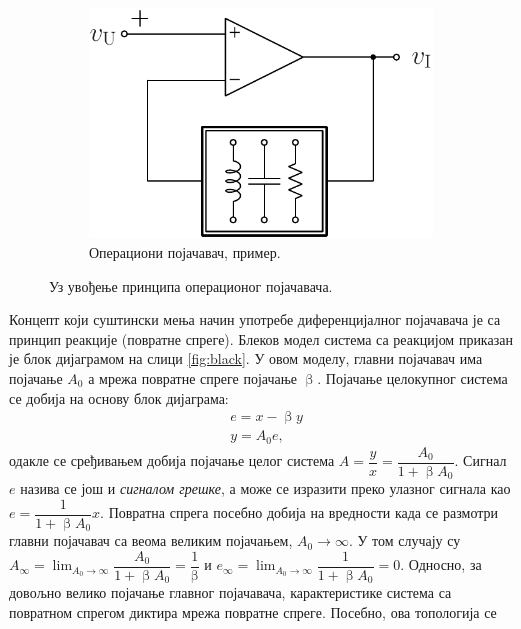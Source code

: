 \begin{figure}[b!]
    ~ %
    \begin{subfigure}[c]{0.32\textwidth}
    \centering
        \includegraphics[scale=0.5]
        {fig/black-model-op-conc.pdf}
        \caption{Операциони појачавач, пример.}
        \label{fig:black3}
    \end{subfigure}
    \caption{Уз увођење принципа операционог појачавача.}
\end{figure}
%
Концепт који суштински мења начин употребе диференцијалног појачавача 
је са принцип реакције (повратне спреге). Блеков модел система са реакцијом 
приказан је 
блок дијаграмом
на слици \ref{fig:black}. У овом моделу, главни 
појачавач има појачање $A_0$ а мрежа повратне спреге појачање 
$\upbeta$. Појачање целокупног система се добија на основу 
блок дијаграма:
\begin{eqnarray}
	&e = x - \upbeta y \\
	&y = A_0 e, 
\end{eqnarray}
одакле се сређивањем добија појачање целог система
$A = \dfrac{y}{x} = \dfrac{A_0}{1 + \upbeta A_0}$.   
%
Сигнал $e$ назива се још и \textit{сигналом грешке}, а може се 
изразити преко улазног сигнала као $e = \dfrac{1}{1 + \upbeta A_0}x$.
Повратна спрега посебно добија на вредности када се размотри 
главни појачавач са веома великим појачањем, $A_{0} \to \infty$. У том случају су $A_{\infty} = \lim_{A_{0} \to \infty} 
\dfrac{A_0}{1 + \upbeta A_0} = \dfrac{1}{\upbeta}$ и 
$e_{\infty} = \lim_{A_{0} \to \infty} 
\dfrac{1}{1 + \upbeta A_0} = 0$. Односно, за довољно велико појачање 
главног појачавача, {карактеристике} {система са 
повратном спрегом диктира мрежа повратне спреге}. Посебно, ова топологија се 
